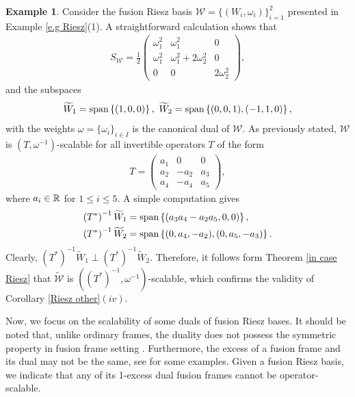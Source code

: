 \documentclass[sn-mathphys-num]{sn-jnl}%
\theoremstyle{definition}
\newtheorem{example}[theorem]{Example}
\theoremstyle{remark}
\numberwithin{equation}{section}
\begin{document}
\begin{example}
Consider the fusion Riesz basis $\mathcal{W}=\{(W_{i},\omega_{i})\}_{i=1}^2 $ presented in Example \ref{e.g Riesz}(1). A straightforward calculation shows that
 \begin{align*}
S_{\mathcal{W}}=\frac{1}{2}\begin{pmatrix}
   \omega_{1}^2  & \omega_{1}^2 & 0\\
   \omega_{1}^2  & \omega_{1}^2+2\omega_{2}^2 & 0 \\
   0  & 0  & 2\omega_{2}^2 
\end{pmatrix},
\end{align*}
and the subspaces
\begin{equation*}
\widetilde{W}_{1}=\textnormal{span} \left\lbrace (1,0,0)\right\rbrace ,~ \widetilde{W}_{2}=\textnormal{span} \left\lbrace (0,0,1) , (-1,1,0)\right\rbrace ,
\end{equation*}
with the weights $\omega= \{\omega_{i}\}_{i \in I} $ is the canonical dual of $\mathcal{W}$. As previously stated, $\mathcal{W}$ is $\left( T,\omega^{-1}\right) $-scalable for all invertible operators $ T $ of the form 
\begin{align*}
T=\begin{pmatrix}
   a_{1}  & 0 & 0\\
   a_{2}  & -a_{2}  & a_{3} \\
   a_{4}  & -a_{4}  & a_{5} 
\end{pmatrix},
\end{align*}
where $ a_{i}\in \Bbb{R}$ for $1 \leq i \leq 5.$ A simple computation gives 
\begin{align*}
\left( T^{*}\right) ^{-1}\widetilde{W}_{1}&=\textnormal{span} \left\lbrace ( a_3 a_4-a_2 a_5 ,0,0) \right\rbrace , \\
\left( T^{*}\right) ^{-1}\widetilde{W}_{2}&=\textnormal{span} \left\lbrace (0,a_4,-a_2) , (0,a_5,-a_3)\right\rbrace .
\end{align*}
Clearly, $ \left( T^{*}\right) ^{-1}\widetilde{W}_{1}\perp \left( T^{*}\right) ^{-1}\widetilde{W}_{2}.$ Therefore, it follows form Theorem \ref{in case Riesz} that $ \widetilde{\mathcal{W}}$ is $\left( \left( T^{*}\right) ^{-1},\omega^{-1}\right) $-scalable, which confirms the validity of Corollary \ref{Riesz other}$(iv)$.
\end{example}

Now, we focus on the scalability of some duals of fusion Riesz bases. It should be noted that, unlike ordinary frames, the duality does not possess the symmetric property in fusion frame setting \cite{Osgooei}. Furthermore, the excess of a fusion frame and its dual may not be the same, see \cite{excess of fusion} for some examples. Given a fusion Riesz basis, we indicate that any of its 1-excess dual fusion frames cannot be operator-scalable. 
\end{document}
